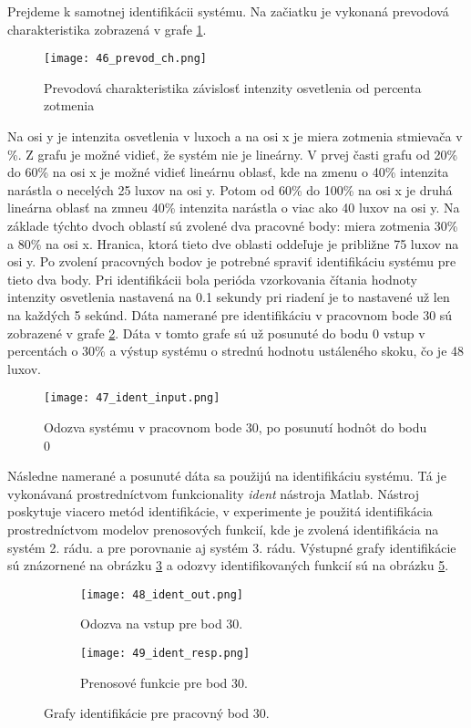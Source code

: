 \indent Prejdeme k samotnej identifikácii systému. Na začiatku je vykonaná prevodová charakteristika zobrazená v grafe \ref{46_prevod_ch}. 
\begin{figure}[!htbp]
\centering
\texttt{[image: 46\_prevod\_ch.png]}
\caption{Prevodová charakteristika závislosť intenzity osvetlenia od percenta zotmenia}
\label{46_prevod_ch}
\end{figure}
Na osi y je intenzita osvetlenia v luxoch a na osi x je miera zotmenia stmievača v \%. Z grafu je možné vidieť, že systém nie je lineárny. V prvej časti grafu od 20\% do 60\% na osi x je možné vidieť lineárnu oblasť, kde na zmenu o 40\% intenzita narástla o necelých 25 luxov na osi y. Potom  od 60\% do 100\% na osi x je druhá lineárna oblasť na zmneu 40\% intenzita narástla o viac ako 40 luxov na osi y. Na základe týchto dvoch oblastí sú zvolené dva pracovné body: miera zotmenia 30\% a 80\% na osi x. Hranica, ktorá tieto dve oblasti oddeľuje je približne 75 luxov na osi y. Po zvolení pracovných bodov je potrebné spraviť identifikáciu systému pre tieto dva body. Pri identifikácii bola perióda vzorkovania čítania hodnoty intenzity osvetlenia nastavená na 0.1 sekundy pri riadení je to nastavené už len na každých 5 sekúnd. Dáta namerané pre identifikáciu v pracovnom bode 30 sú zobrazené v grafe \ref{47_ident_input}. Dáta v tomto grafe sú už posunuté do bodu 0 vstup v percentách o 30\% a výstup systému o strednú hodnotu ustáleného skoku, čo je 48 luxov. 
\begin{figure}[!htbp]
\centering
\texttt{[image: 47\_ident\_input.png]}
\caption{Odozva systému v pracovnom bode 30, po posunutí hodnôt do bodu 0}
\label{47_ident_input}
\end{figure}
Následne namerané a posunuté dáta sa použijú na identifikáciu systému. Tá je vykonávaná prostredníctvom funkcionality \textit{ident} nástroja Matlab. Nástroj poskytuje viacero metód identifikácie, v experimente je použitá identifikácia prostredníctvom modelov prenosových funkcií, kde je zvolená identifikácia na systém 2. rádu. a pre porovnanie aj systém 3. rádu. Výstupné grafy identifikácie  sú znázornené na obrázku \ref{48_ident_out} a odozvy identifikovaných funkcií sú na obrázku \ref{49_ident_resp}.

\begin{figure}[!htbp]
\centering
\begin{subfigure}{0.5\linewidth}
\texttt{[image: 48\_ident\_out.png]}
\caption{Odozva na vstup pre bod 30.}
\label{48_ident_out}
\end{subfigure}%
\begin{subfigure}{0.5\linewidth}
\texttt{[image: 49\_ident\_resp.png]}
\caption{Prenosové funkcie pre bod 30.}
\label{49_ident_resp}
\end{subfigure}
\caption{Grafy identifikácie pre pracovný bod 30.}
\end{figure}

